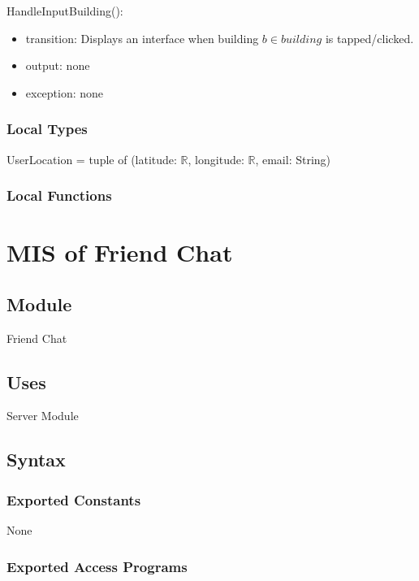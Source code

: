 \documentclass[12pt, titlepage]{article}
\begin{document}
\noindent HandleInputBuilding():
\begin{itemize}
\item transition: Displays an interface when building $b \in building$ is tapped/clicked.
\item output: none
\item exception: none
\end{itemize}

\subsubsection{Local Types}

UserLocation = tuple of (latitude: $\mathbb{R}$, longitude: $\mathbb{R}$, email: String)

\subsubsection{Local Functions}

\newpage

\section{MIS of Friend Chat} \label{mFC}

\subsection{Module}

Friend Chat

\subsection{Uses}

Server Module

\subsection{Syntax}

\subsubsection{Exported Constants}

None

\subsubsection{Exported Access Programs}
\end{document}

